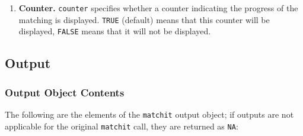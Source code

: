 \documentclass[oneside,letterpaper,titlepage]{article}
\begin{document}
\begin{enumerate}
\item \textbf{Counter.} \texttt{counter} specifies whether a counter
  indicating the progress of the matching is displayed.  \texttt{TRUE}
  (default) means that this counter will be displayed, \texttt{FALSE}
  means that it will not be displayed.

\end{enumerate}
  
\subsection{Output}

\subsubsection{Output Object Contents}

The following are the elements of the \texttt{matchit} output object;
if outputs are not applicable for the original \texttt{matchit} call,
they are returned as \texttt{NA}:
\end{document}

